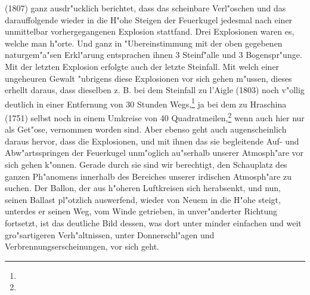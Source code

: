 \documentclass[a4paper, 8pt, oneside, polutonikogreek, german]{article}
\begin{document}
(1807) ganz ausdr"ucklich berichtet, dass das scheinbare Verl"oschen und das darauffolgende wieder in die H"ohe Steigen der Feuerkugel jedesmal nach einer unmittelbar vorhergegangenen Explosion stattfand. Drei Explosionen waren es, welche man h"orte. Und ganz in "Ubereinstimmung mit der oben gegebenen naturgem"a"sen Erkl"arung entsprachen ihnen 3 Steinf"alle und 3 Bogenspr"unge. Mit der letzten Explosion erfolgte auch der letzte Steinfall. Mit welch einer ungeheuren Gewalt "ubrigens diese Explosionen vor sich gehen m"ussen, dieses erhellt daraus, dass dieselben z. B. bei dem Steinfall zu l'Aigle (1803) noch v"ollig deutlich in einer Entfernung von 30 Stunden Wegs,\footnote{} ja bei dem zu Hraschina (1751) selbst noch in einem Umkreise von 40 Quadratmeilen,\footnote{} wenn auch hier nur als Get"ose, vernommen worden sind. Aber ebenso geht auch augenscheinlich daraus hervor, dass die Explosionen, und mit ihnen das sie begleitende Auf- und Abw"artsspringen der Feuerkugel unm"oglich au"serhalb unserer Atmosph"are vor sich gehen k"onnen. Gerade durch sie sind wir berechtigt, den Schauplatz des ganzen Ph"anomens innerhalb des Bereiches unserer irdischen Atmosph"are zu suchen. Der Ballon, der aus h"oheren Luftkreisen sich herabsenkt, und nun, seinen Ballast pl"otzlich auswerfend, wieder von Neuem in die H"ohe steigt, unterdes er seinen Weg, vom Winde getrieben, in unver"anderter Richtung fortsetzt, ist das deutliche Bild dessen, was dort unter minder einfachen und weit gro"sartigeren Verh"altnissen, unter Donnerschl"agen und Verbrennungserscheinungen, vor sich geht.
\end{document}
